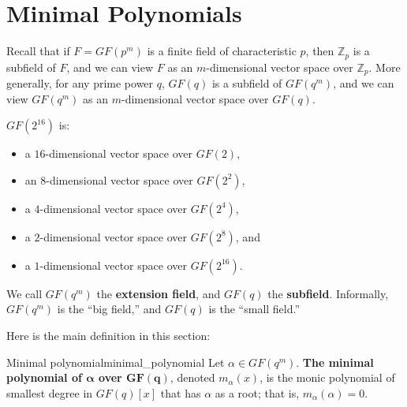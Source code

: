 \section{Minimal Polynomials}
Recall that if $ F=GF(p^m) $ is a finite field of characteristic $ p $,
then $ \mathbb{Z}_p $ is a subfield of $ F $, and we can view
$ F $ as an $ m $-dimensional vector space over $ \mathbb{Z}_p $. More
generally, for any prime power $ q $, $ GF(q) $ is a subfield of $ GF(q^m) $,
and we can view $ GF(q^m) $ as an $ m $-dimensional vector space over $ GF(q) $.

\begin{Example}{}{}
    $ GF(2^{16}) $ is:
    \begin{itemize}
        \item a $ 16 $-dimensional vector space over $ GF(2) $,
        \item an $ 8 $-dimensional vector space over $ GF(2^2) $,
        \item a $ 4 $-dimensional vector space over $ GF(2^4) $,
        \item a $ 2 $-dimensional vector space over $ GF(2^8) $, and
        \item a $ 1 $-dimensional vector space over $ GF(2^{16}) $.
    \end{itemize}
\end{Example}

We call $ GF(q^m) $ the \textbf{extension field}, and $ GF(q) $ the \textbf{subfield}.
Informally, $ GF(q^m) $ is the ``big field,'' and $ GF(q) $ is the ``small field.''

Here is the main definition in this section:

\begin{Definition}{Minimal polynomial}{minimal_polynomial}
    Let $ \alpha\in GF(q^m) $. \textbf{The minimal polynomial
        of $ \bm{\alpha} $ over $ \bm{GF(q)} $}, denoted $ m_\alpha(x) $, is
    the monic polynomial of smallest degree in $ GF(q)[x] $ that
    has $ \alpha $ as a root; that is, $ m_\alpha(\alpha)=0 $.
\end{Definition}

